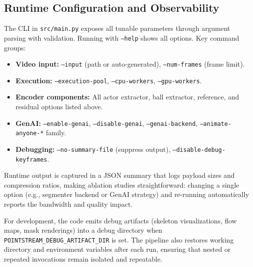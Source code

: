 \documentclass[manuscript, screen]{acmart}
\begin{document}
\subsection{Runtime Configuration and Observability}
The CLI in \texttt{src/main.py} exposes all tunable parameters through argument parsing with validation. Running with \texttt{--help} shows all options. Key command groups:
\begin{itemize}[topsep=0pt,itemsep=0pt,leftmargin=*]
    \item \textbf{Video input:} \texttt{--input} (path or auto-generated), \texttt{--num-frames} (frame limit).
    \item \textbf{Execution:} \texttt{--execution-pool}, \texttt{--cpu-workers}, \texttt{--gpu-workers}.
    \item \textbf{Encoder components:} All actor extractor, ball extractor, reference, and residual options listed above.
    \item \textbf{GenAI:} \texttt{--enable-genai}, \texttt{--disable-genai}, \texttt{--genai-backend}, \texttt{--animate-anyone-*} family.
    \item \textbf{Debugging:} \texttt{--no-summary-file} (suppress output), \texttt{--disable-debug-keyframes}.
\end{itemize}
Runtime output is captured in a JSON summary that logs payload sizes and compression ratios, making ablation studies straightforward: changing a single option (e.g., segmenter backend or GenAI strategy) and re-running automatically reports the bandwidth and quality impact.

For development, the code emits debug artifacts (skeleton visualizations, flow maps, mask renderings) into a debug directory when \texttt{POINTSTREAM\_DEBUG\_ARTIFACT\_DIR} is set. The pipeline also restores working directory and environment variables after each run, ensuring that nested or repeated invocations remain isolated and repeatable.








\end{document}
